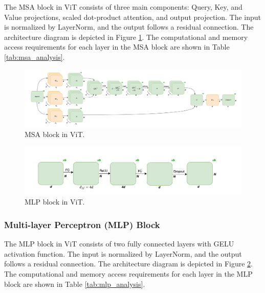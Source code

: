 \documentclass[12pt]{article}
\begin{document}
The MSA block in ViT consists of three main components: Query, Key, and Value projections, scaled dot-product attention, and output projection. The input is normalized by LayerNorm, and the output follows a residual connection. The architecture diagram is depicted in Figure \ref{fig:msa_architecture}. The computational and memory access requirements for each layer in the MSA block are shown in Table \ref{tab:msa_analysis}.

\begin{figure}
    \centering
    \includegraphics[width=\linewidth]{images/msa.png}
    \caption{MSA block in ViT.}
    \label{fig:msa_architecture}
\end{figure}

\begin{figure}
    \centering
    \includegraphics[width=0.7\linewidth]{images/mlp.png}
    \caption{MLP block in ViT.}
    \label{fig:mlp_architecture}
\end{figure}

\subsubsection{Multi-layer Perceptron (MLP) Block}

The MLP block in ViT consists of two fully connected layers with GELU activation function. The input is normalized by LayerNorm, and the output follows a residual connection. The architecture diagram is depicted in Figure \ref{fig:mlp_architecture}. The computational and memory access requirements for each layer in the MLP block are shown in Table \ref{tab:mlp_analysis}.
\end{document}
